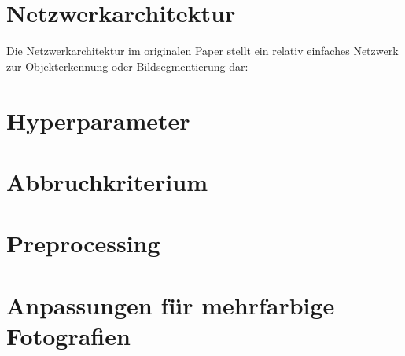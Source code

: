 \section{Netzwerkarchitektur}
\label{sec:networkarch}

Die Netzwerkarchitektur im originalen Paper stellt ein relativ einfaches Netzwerk zur Objekterkennung oder Bildsegmentierung dar:

\section{Hyperparameter}
\label{sec:hyperparameter}

\section{Abbruchkriterium}
\label{sec:stoppingcriteria}

\section{Preprocessing}
\label{sec:preprocessing}

\section{Anpassungen für mehrfarbige Fotografien}
\label{sec:referenceimages}